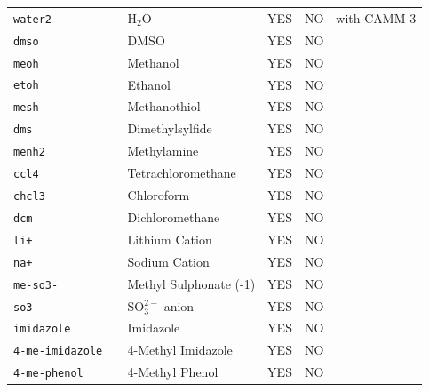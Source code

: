 \documentclass[b5paper,oneside,fleqn,11pt]{book}
\begin{document}
\begin{refsection}
\begin{landscape}
\begin{longtable}{ p{} p{} p{} p{} p{} }
 \tt{water2          } & H$_2$O                          & YES  &   NO     &     with CAMM-3                          \\
 \tt{dmso            } & DMSO                            & YES  &   NO     &                                          \\
 \tt{meoh            } & Methanol                        & YES  &   NO     &                                          \\
 \tt{etoh            } & Ethanol                         & YES  &   NO     &                                          \\
 \tt{mesh            } & Methanothiol                    & YES  &   NO     &                                          \\
 \tt{dms             } & Dimethylsylfide                 & YES  &   NO     &                                          \\
 \tt{menh2           } & Methylamine                     & YES  &   NO     &                                          \\
 \tt{ccl4            } & Tetrachloromethane              & YES  &   NO     &                                          \\
 \tt{chcl3           } & Chloroform                      & YES  &   NO     &                                          \\
 \tt{dcm             } & Dichloromethane                 & YES  &   NO     &                                          \\
 \tt{li+             } & Lithium Cation                  & YES  &   NO     &                                          \\
 \tt{na+             } & Sodium Cation                   & YES  &   NO     &                                          \\
 \tt{me-so3-         } & Methyl Sulphonate (-1)          & YES  &   NO     &                                          \\
 \tt{so3--           } & SO$_3^{2-}$ anion               & YES  &   NO     &                                          \\
 \tt{imidazole       } & Imidazole                       & YES  &   NO     &                                          \\
 \tt{4-me-imidazole  } & 4-Methyl Imidazole              & YES  &   NO     &                                          \\
 \tt{4-me-phenol     } & 4-Methyl Phenol                 & YES  &   NO     &                                          \\

\end{longtable}
\end{landscape}
\end{refsection}
\end{document}
